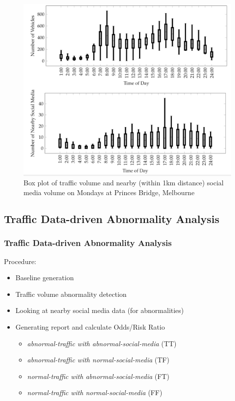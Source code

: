 \begin{frame}
    \frametitle{}
    \begin{figure}
    	\centering
    	\includegraphics[width=0.7\columnwidth]{resource/figures/box_plot.png}
    	\caption{Box plot of traffic volume and nearby (within 1km distance) social media volume on Mondays at Princes Bridge, Melbourne}
    \end{figure}
\end{frame}


\subsection{Traffic Data-driven Abnormality Analysis}
\begin{frame}
    \frametitle{Traffic Data-driven Abnormality Analysis}
    Procedure:
    \begin{itemize}
	    \item Baseline generation
	    \item Traffic volume abnormality detection
	    \item Looking at nearby social media data (for abnormalities)
	    \item Generating report and calculate Odds/Risk Ratio \cite{lipsitz1991generalized}
	    \begin{itemize} \small 
	        \item {\it abnormal-traffic with abnormal-social-media} (TT)
	        \item {\it abnormal-traffic with normal-social-media} (TF)
	        \item {\it normal-traffic with abnormal-social-media} (FT)
	        \item {\it normal-traffic with normal-social-media} (FF)
	    \end{itemize}
    \end{itemize}
\end{frame}

